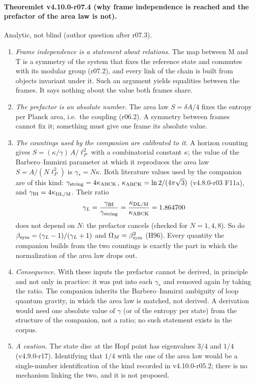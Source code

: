 \paragraph{Theoremlet v4.10.0-r07.4 (why frame independence is reached and the prefactor of the area law is not).}
Analytic, not blind (author question after r07.3).
\begin{enumerate}[leftmargin=2em]
\item[(a)] \emph{Frame independence is a statement about relations.}  The map between M and T is a symmetry of the system that fixes the reference state
and commutes with its modular group (r07.2), and every link of the chain is built from objects invariant under it.  Such an argument yields equalities
between the frames.  It says nothing about the value both frames share.
\item[(b)] \emph{The prefactor is an absolute number.}  The area law \(S=\delta A/4\) fixes the entropy per Planck area, i.e.\ the coupling (r06.2).  A
symmetry between frames cannot fix it; something must give one frame its absolute value.
\item[(c)] \emph{The countings used by the companion are calibrated to it.}  A horizon counting gives \(S=(\kappa/\gamma)\,A/\ell_P^2\) with a combinatorial
constant \(\kappa\); the value of the Barbero--Immirzi parameter at which it reproduces the area law \(S=A/(N\ell_P^2)\) is \(\gamma_*=N\kappa\).  Both literature
values used by the companion are of this kind: \(\gamma_{\rm string}=4\kappa_{\rm ABCK}\), \(\kappa_{\rm ABCK}=\ln2/(4\pi\sqrt3)\) (v4.8.0-r03 F11a), and
\(\gamma_{\rm BI}=4\kappa_{\rm DL/M}\).  Their ratio
\[
\gamma_L=\frac{\gamma_{\rm BI}}{\gamma_{\rm string}}=\frac{\kappa_{\rm DL/M}}{\kappa_{\rm ABCK}}=1.864700
\]
does not depend on \(N\): the prefactor cancels (checked for \(N=1,4,8\)).  So do \(\beta_{\rm sym}=(\gamma_L-1)/(\gamma_L+1)\) and \(\Omega_M=\beta_{\rm sym}^2\)
(H96).  Every quantity the companion builds from the two countings is exactly the part in which the normalization of the area law drops out.
\item[(d)] \emph{Consequence.}  With these inputs the prefactor cannot be derived, in principle and not only in practice: it was put into each
\(\gamma_*\) and removed again by taking the ratio.  The companion inherits the Barbero--Immirzi ambiguity of loop quantum gravity, in which the area
law is matched, not derived.  A derivation would need one absolute value of \(\gamma\) (or of the entropy per state) from the structure of the companion,
not a ratio; no such statement exists in the corpus.
\item[(e)] \emph{A caution.}  The state disc at the Hopf point has eigenvalues \(3/4\) and \(1/4\) (v4.9.0-r17).  Identifying that \(1/4\) with the one of the
area law would be a single-number identification of the kind recorded in v4.10.0-r05.2; there is no mechanism linking the two, and it is not proposed.
\end{enumerate}

